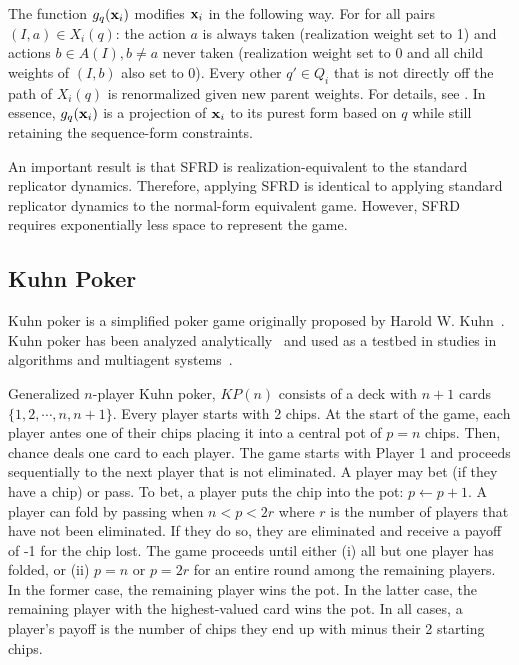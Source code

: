 \documentclass{aamas2014}
\begin{document}
The function $g_q(\mathbf{x}_i)$ modifies $\mathbf{x}_i$ in the following way. 
For for all pairs $(I,a) \in X_i(q)$: the action $a$ is always taken (realization weight
set to 1) and actions $b \in A(I), b \not= a$ never taken (realization weight set to 0 and all child weights of $(I,b)$ also set to 0). 
Every other $q' \in Q_i$ that is not directly off the path of $X_i(q)$ is renormalized given new parent weights.
For details, see \cite[Algorithm 1]{Gatti13Efficient}. In essence, $g_q(\mathbf{x}_i)$ is a projection of $\mathbf{x}_i$ to its purest form based on $q$ 
while still retaining the sequence-form constraints. 

An important result is that SFRD is realization-equivalent to the standard replicator dynamics. Therefore, applying SFRD is identical 
to applying standard replicator dynamics to the normal-form equivalent game. However, SFRD requires exponentially less space to represent
the game. 

\subsection{Kuhn Poker}


Kuhn poker is a simplified poker game originally proposed by Harold W. Kuhn~\cite{Kuhn50}. 
Kuhn poker has been analyzed analytically~\cite{hoehn05} and used as a testbed in studies in 
algorithms and multiagent systems~\cite{AbouRisk10,Szafron13Kuhn}.  

Generalized $n$-player Kuhn poker, $KP(n)$ consists of a deck with $n+1$ cards $\{ 1, 2, \cdots, n, n+1 \}$. 
Every player starts with 2 chips. At the start of the game, each player antes one of their chips placing it
into a central pot of $p = n$ chips. 
Then, chance deals one card to each player. 
The game starts with Player 1 and proceeds sequentially to the next player that is not eliminated. 
A player may bet (if they have a chip) or pass. 
To bet, a player puts the chip into the pot: $p \leftarrow p + 1$. 
A player can fold by passing when $n < p < 2r$ where $r$ is the number of players that have not been eliminated. 
If they do so, they are eliminated and receive a payoff of -1 for the chip lost. 
The game proceeds until either (i) all but one player has folded, or (ii) $p = n$ or $p = 2r$ for an entire round 
among the remaining players. In the former case, the remaining player wins the pot. In the latter case, the 
remaining player with the highest-valued card wins the pot. In all cases, a player's payoff is the number of chips
they end up with minus their 2 starting chips. 
\end{document}
